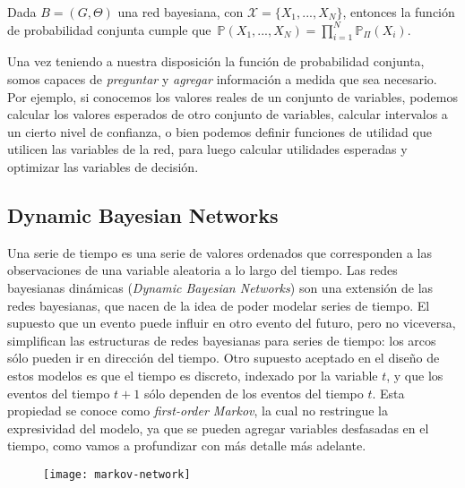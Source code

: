\begin{proposition}
Dada $B=(G,\Theta)$ una red bayesiana, con $\mathcal{X}=\{X_{1},...,X_{N}\}$, entonces la función de probabilidad conjunta cumple que\ $\mathbb{P}(X_{1},...,X_{N})=\prod\limits_{i=1}^{N}\mathbb{P}_{\Pi }(X_{i}).$
\end{proposition}

Una vez teniendo a nuestra disposición la función de probabilidad conjunta, somos capaces de \emph{preguntar} y \emph{agregar} información a medida que sea necesario. Por ejemplo, si conocemos los valores reales de un conjunto de  variables, podemos calcular los valores esperados de otro conjunto de variables, calcular intervalos a un cierto nivel de confianza, o bien podemos definir funciones de utilidad que utilicen las variables de la red, para luego calcular utilidades esperadas y optimizar las variables de decisión.


\subsection{Dynamic Bayesian Networks}

Una serie de tiempo es una serie de valores ordenados que corresponden a las observaciones de una variable aleatoria a lo largo del tiempo. Las redes bayesianas dinámicas (\emph{Dynamic Bayesian Networks}) son una extensión de las redes bayesianas, que nacen de la idea de poder modelar series de tiempo. El supuesto que un evento puede influir en otro evento del futuro, pero no viceversa, simplifican las estructuras de redes bayesianas para series de tiempo: los arcos sólo pueden ir en dirección del tiempo. Otro supuesto aceptado en el dise\~{n}o de estos modelos es que el tiempo es discreto, indexado por la variable $t$, y que los eventos del tiempo $t+1$ sólo dependen de los eventos del tiempo $t$.  Esta propiedad se conoce como \emph{first-order Markov}, la cual no restringue la expresividad del modelo, ya que se pueden agregar variables desfasadas en el tiempo, como vamos a profundizar con más detalle más adelante.

\begin{figure}
	\centering
	\texttt{[image: markov-network]}
\end{figure}


